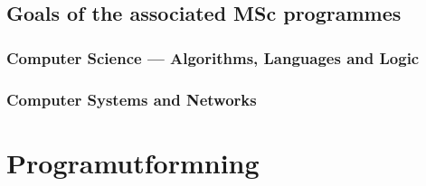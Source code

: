 \documentclass[twocolumn]{article}
\begin{document}



\subsection{Goals of the associated MSc programmes}
\subsubsection{Computer Science --- Algorithms, Languages and Logic}


\subsubsection{Computer Systems and Networks}



\section{Programutformning}
\newcommand{\courselink}[2]{\href{https://www.student.chalmers.se/sp/course?course_id=#1}{#2}}

\newcommand{\introFP }{\courselink{16717}{Introduktion till funktionell programmering}}
\newcommand{\DiskMat }{\courselink{16714}{Inledande diskret matematik}}
\newcommand{\DigoDat }{\courselink{16012}{Grundläggande datorteknik (ny)}}
\newcommand{\LinAlg  }{\courselink{16376}{Linjär algebra}}
\newcommand{\MOP     }{\courselink{15446}{Programmering av inbyggda system (ny)}}
\newcommand{\MatAn   }{\courselink{15413}{Matematisk analys}}
\newcommand{\OOP     }{\courselink{16190}{Objektorienterad programmering (flyttad/ny)}}
\newcommand{\ElKrets }{\courselink{15353}{Elektriska kretsar och fält}}
\end{document}
